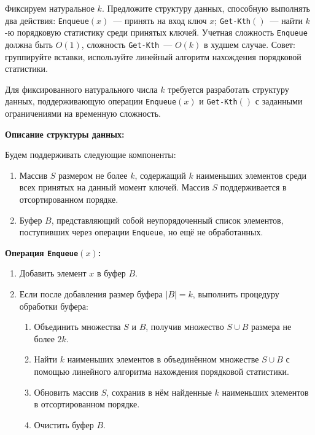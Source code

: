 \documentclass[11pt]{article}
\begin{document}
\begin{problem}{25}
Фиксируем натуральное $k$.
Предложите структуру данных, способную выполнять два действия: \texttt{Enqueue}$(x)$~--- принять на вход ключ $x$; \texttt{Get-Kth}$()$~---
найти $k$-ю порядковую статистику среди принятых ключей. Учетная сложность \texttt{Enqueue} должна быть $O(1)$,
сложность \texttt{Get-Kth}~--- $O(k)$ в худшем случае.
Совет: группируйте вставки, используйте линейный алгоритм нахождения порядковой статистики.
\end{problem}

\begin{solution}
    Для фиксированного натурального числа $k$ требуется разработать структуру данных, поддерживающую операции \texttt{Enqueue}$(x)$ и \texttt{Get-Kth}$()$ с заданными ограничениями на временную сложность.

    \textbf{Описание структуры данных:}

    Будем поддерживать следующие компоненты:

    \begin{enumerate}
        \item Массив $S$ размером не более $k$, содержащий $k$ наименьших элементов среди всех принятых на данный момент ключей. Массив $S$ поддерживается в отсортированном порядке.
        \item Буфер $B$, представляющий собой неупорядоченный список элементов, поступивших через операции \texttt{Enqueue}, но ещё не обработанных.
    \end{enumerate}

    \textbf{Операция \texttt{Enqueue}$(x)$:}

    \begin{enumerate}
        \item Добавить элемент $x$ в буфер $B$.
        \item Если после добавления размер буфера $|B| = k$, выполнить процедуру обработки буфера:
              \begin{enumerate}
                  \item Объединить множества $S$ и $B$, получив множество $S \cup B$ размера не более $2k$.
                  \item Найти $k$ наименьших элементов в объединённом множестве $S \cup B$ с помощью линейного алгоритма нахождения порядковой статистики.
                  \item Обновить массив $S$, сохранив в нём найденные $k$ наименьших элементов в отсортированном порядке.
                  \item Очистить буфер $B$.
              \end{enumerate}
    \end{enumerate}


\end{solution}
\end{document}
